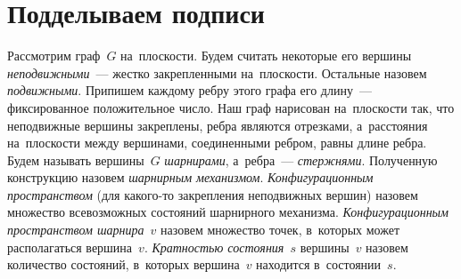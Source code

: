 
\section*{Подделываем подписи}



Рассмотрим граф~$G$ на~плоскости.
Будем считать некоторые его вершины \emph{неподвижными}~--- жестко
закрепленными на~плоскости.
Остальные назовем \emph{подвижными}.
Припишем каждому ребру этого графа его длину~--- фиксированное положительное
число.
Наш граф нарисован на~плоскости так, что неподвижные вершины закреплены, ребра
являются отрезками, а~расстояния на~плоскости между вершинами, соединенными
ребром, равны длине ребра.
Будем называть вершины~$G$ \emph{шарнирами}, а~ребра~--- \emph{стержнями}.
Полученную конструкцию назовем \emph{шарнирным механизмом}.
\emph{Конфигурационным пространством} (для какого-то закрепления неподвижных
вершин) назовем множество всевозможных состояний шарнирного механизма.
\emph{Конфигурационным пространством шарнира~$v$} назовем множество точек,
в~которых может располагаться вершина~$v$.
\emph{Кратностью состояния~$s$} вершины~$v$ назовем количество состояний,
в~которых вершина~$v$ находится в~состоянии~$s$.

